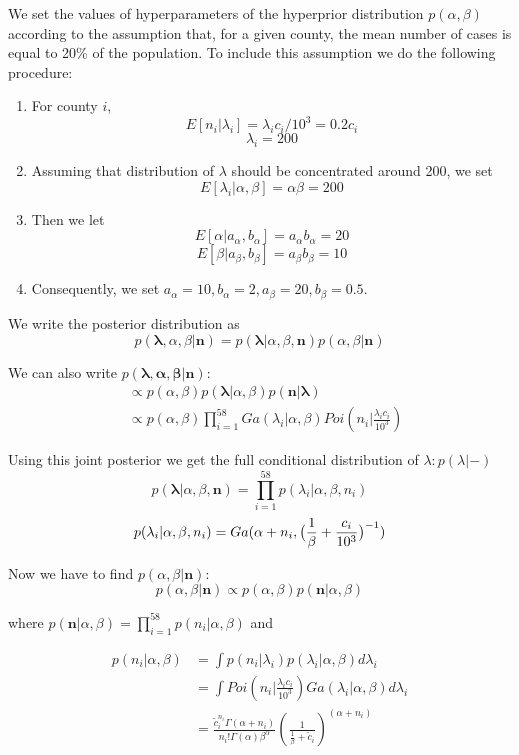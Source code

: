 \documentclass[11pt,twocolumn]{asaproc}
\begin{document}
We set the values of hyperparameters of the hyperprior distribution $p(\alpha, \beta)$ according to the assumption that, for a given county, the mean number of cases is equal to 20\% of the population. To include this assumption we do the following procedure:

\begin{enumerate}
\item For county $i$, $$E[n_i | \lambda_i] = \lambda_i c_i/10^3 = 0.2c_i$$ $$\lambda_i = 200$$
\item Assuming that distribution of $\lambda$ should be concentrated around 200, we set $$E[\lambda_i|\alpha, \beta] = \alpha\beta = 200$$
\item Then we let $$E[\alpha|a_{\alpha}, b_{\alpha}] = a_{\alpha}b_{\alpha} = 20 $$ $$E[\beta|a_{\beta}, b_{\beta}] = a_{\beta}b_{\beta} =10 $$
\item Consequently, we set $a_{\alpha} = 10, b_{\alpha} = 2, a_{\beta} = 20, b_{\beta} = 0.5$. 
\end{enumerate}

We write the posterior distribution as $$p(\mathbf{\lambda}, \alpha, \beta| \mathbf{n}) = p(\mathbf{\lambda}|\alpha, \beta, \mathbf{n})p(\alpha, \beta| \mathbf{n})$$ 

We can also write $p(\mathbf{\lambda, \alpha, \beta}| \mathbf{n})$: 
\begin{align*}
& \propto p(\alpha, \beta)p(\mathbf{\lambda}|\alpha, \beta)p(\mathbf{n}|\mathbf{\lambda}) \\
&\propto p(\alpha, \beta)\prod_{i=1}^{58}Ga({\lambda_i|\alpha, \beta})Poi(n_i|\frac{\lambda_i c_i}{10^3})
\end{align*}

Using this joint posterior we get the full conditional distribution of $\lambda: p(\lambda|-)$
$$p(\mathbf{\lambda}|\alpha, \beta, \mathbf{n}) = \prod_{i=1}^{58}p(\lambda_i|\alpha, \beta, n_i)$$ 
$$p(\lambda_i|\alpha, \beta, n_i) = Ga(\alpha + n_i, \big{(}\frac{1}{\beta} + \frac{c_i}{10^3}\big{)}^{-1})$$

Now we have to find $p(\alpha, \beta| \mathbf{n})$: 
$$p(\alpha, \beta| \mathbf{n}) \propto p(\alpha, \beta)p(\mathbf{n}|\alpha, \beta)$$

where $p(\mathbf{n}|\alpha, \beta) = \prod_{i=1}^{58}p(n_i|\alpha, \beta)$ and 

\begin{align*}
p(n_i|\alpha, \beta) & = \int p(n_i|\lambda_i)p(\lambda_i|\alpha, \beta) d\lambda_i \\
& = \int Poi(n_i|\frac{\lambda_ic_i }{10^3})Ga(\lambda_i | \alpha, \beta) d\lambda_i \\
& = \frac{\tilde{c}_i^{n_i}\Gamma(\alpha+n_i)}{n_i!\Gamma(\alpha)\beta^{\alpha}} (\frac{1}{\frac{1}{\beta} + \tilde{c}_i})^{(\alpha+n_i)}
\end{align*}
\end{document}

